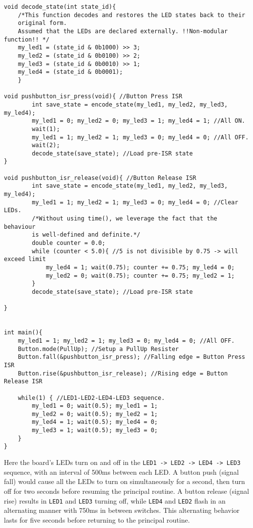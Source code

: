 \documentclass{article}
\begin{document}
\begin{verbatim}
void decode_state(int state_id){
    /*This function decodes and restores the LED states back to their
    original form.
    Assumed that the LEDs are declared externally. !!Non-modular function!! */
    my_led1 = (state_id & 0b1000) >> 3;
    my_led2 = (state_id & 0b0100) >> 2;
    my_led3 = (state_id & 0b0010) >> 1;
    my_led4 = (state_id & 0b0001);
    }

void pushbutton_isr_press(void){ //Button Press ISR
        int save_state = encode_state(my_led1, my_led2, my_led3, my_led4);
        my_led1 = 0; my_led2 = 0; my_led3 = 1; my_led4 = 1; //All ON.
        wait(1);
        my_led1 = 1; my_led2 = 1; my_led3 = 0; my_led4 = 0; //All OFF.
        wait(2);
        decode_state(save_state); //Load pre-ISR state
}

void pushbutton_isr_release(void){ //Button Release ISR
        int save_state = encode_state(my_led1, my_led2, my_led3, my_led4);
        my_led1 = 1; my_led2 = 1; my_led3 = 0; my_led4 = 0; //Clear LEDs.
        /*Without using time(), we leverage the fact that the behaviour
        is well-defined and definite.*/
        double counter = 0.0;
        while (counter < 5.0){ //5 is not divisible by 0.75 -> will exceed limit
            my_led4 = 1; wait(0.75); counter += 0.75; my_led4 = 0;
            my_led2 = 0; wait(0.75); counter += 0.75; my_led2 = 1;
        }
        decode_state(save_state); //Load pre-ISR state
       
}


int main(){
    my_led1 = 1; my_led2 = 1; my_led3 = 0; my_led4 = 0; //All OFF.
    Button.mode(PullUp); //Setup a PullUp Resister
    Button.fall(&pushbutton_isr_press); //Falling edge = Button Press ISR
    Button.rise(&pushbutton_isr_release); //Rising edge = Button Release ISR
    
    while(1) { //LED1-LED2-LED4-LED3 sequence.
        my_led1 = 0; wait(0.5); my_led1 = 1;
        my_led2 = 0; wait(0.5); my_led2 = 1;
        my_led4 = 1; wait(0.5); my_led4 = 0;
        my_led3 = 1; wait(0.5); my_led3 = 0;    
    }
}
\end{verbatim}


Here the board's LEDs turn on and off in the \texttt{LED1 -> LED2 -> LED4 -> LED3} sequence, with an interval of 500ms between each LED. A button push (signal fall) would cause all the LEDs to turn on simultaneously for a second, then turn off for two seconds before resuming the principal routine. A button release (signal rise) results in \texttt{LED1} and \texttt{LED3} turning off, while \texttt{LED4} and \texttt{LED2} flash in an alternating manner with 750ms in between switches. This alternating behavior lasts for five seconds before returning to the principal routine.
\end{document}
